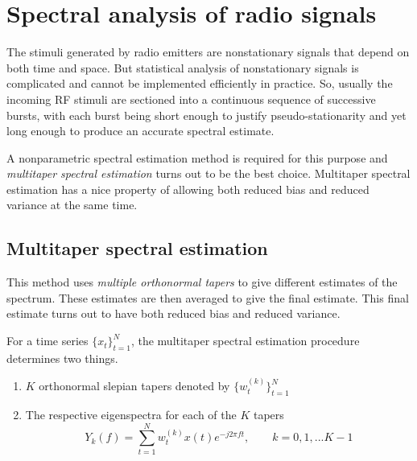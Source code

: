 \documentclass[12pt]{article}
\begin{document}
\section{Spectral analysis of radio signals}

The stimuli generated by radio emitters are nonstationary signals that depend on both time and space. But statistical analysis of nonstationary signals is complicated and cannot be implemented efficiently in practice. So, usually the incoming RF stimuli are sectioned into a continuous sequence of successive bursts, with each burst being short enough to justify pseudo-stationarity and yet long enough to produce an accurate spectral estimate\cite{haykin2009, haykin2005}.


A nonparametric spectral estimation method is required for this purpose and \emph{multitaper spectral estimation}\cite{haykin2009, thomson1982, percival1993} turns out to be the best choice. Multitaper spectral estimation has a nice property of allowing both reduced bias and reduced variance at the same time.

\subsection*{Multitaper spectral estimation}
This method uses \emph{multiple orthonormal tapers}\cite{haykin2009, thomson1982} to give different estimates of the spectrum. These estimates are then averaged to give the final estimate. This final estimate turns out to have both reduced bias and reduced variance\cite{haykin2009, thomson1982, percival1993}.


For a time series $\{x_t\}_{t=1}^N$, the multitaper spectral estimation procedure determines two things.
\begin{enumerate}
    \item $K$ orthonormal slepian tapers denoted by $\{w_t^{(k)}\}_{t=1}^{N}$
    \item The respective eigenspectra for each of the $K$ tapers
\begin{equation}
   Y_k(f) = \sum_{t=1}^N w_t^{(k)} x(t) e^{-j2\pi{}ft}, \qquad k = 0, 1, ...K-1
\end{equation}
\end{enumerate}
\end{document}
